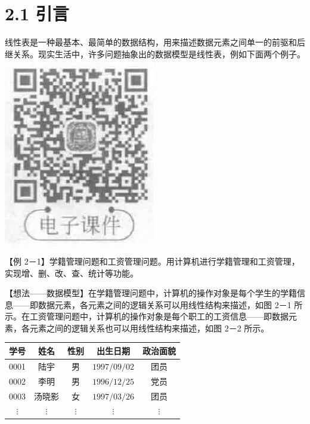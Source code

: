 \documentclass[10pt]{article}
\begin{document}
\section*{2.1 引言}
线性表是一种最基本、最简单的数据结构，用来描述数据元素之间单一的前驱和后继关系。现实生活中，许多问题抽象出的数据模型是线性表，例如下面两个例子。\\
\includegraphics[max width=\textwidth, center]{2025_06_06_704745ea57b15b2333e5g-041(2)}

【例 2－1】学籍管理问题和工资管理问题。用计算机进行学籍管理和工资管理，实现增、删、改、查、统计等功能。

【想法——数据模型】在学籍管理问题中，计算机的操作对象是每个学生的学籍信息——即数据元素，各元素之间的逻辑关系可以用线性结构来描述，如图 2－1 所示。在工资管理问题中，计算机的操作对象是每个职工的工资信息——即数据元素，各元素之间的逻辑关系也可以用线性结构来描述，如图 2－2 所示。

\begin{center}
\begin{tabular}{|c|c|c|c|c|}
\hline
学号 & 姓名 & 性别 & 出生日期 & 政治面貌 \\
\hline
0001 & 陆宇 & 男 & $1997 / 09 / 02$ & 团员 \\
\hline
0002 & 李明 & 男 & $1996 / 12 / 25$ & 党员 \\
\hline
0003 & 汤晓影 & 女 & $1997 / 03 / 26$ & 团员 \\
\hline
$\vdots$ & $\vdots$ & $\vdots$ & $\vdots$ & $\vdots$ \\
\hline
\end{tabular}
\end{center}
\end{document}
